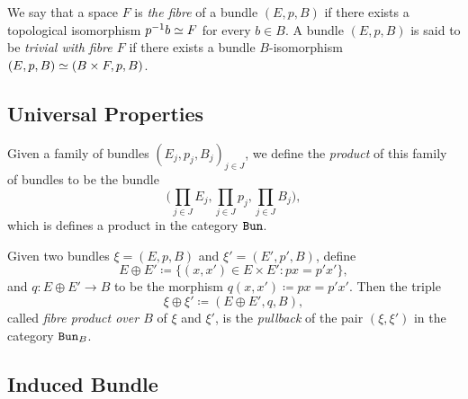 \documentclass[../../../deep-dive]{subfile}
\begin{document}
\begin{definition}
    \label{def:fibre-of-a-bundle}
    We say that a space \(F\) is \emph{the fibre} of a bundle \((E, p, B)\) if there
    exists a topological isomorphism \(p^{-1} b \simeq F\) for every \(b \in B\). A
    bundle \((E, p, B)\) is said to be \emph{trivial with fibre \(F\)} if there
    exists a bundle \(B\)-isomorphism \((E, p, B) \simeq (B \times F, p, B)\).
\end{definition}

\subsection{Universal Properties}

\begin{proposition}
    \label{prop:bundle-products}
    Given a family of bundles \((E_j, p_j, B_j)_{j \in J}\), we define the
    \emph{product} of this family of bundles to be the bundle
    \[
        \Big( \prod_{j \in J} E_j, \prod_{j \in J} p_j, \prod_{j \in J} B_j \Big),
    \]
    which is defines a product in the category \({\texttt{Bun}}\).
\end{proposition}

\begin{proposition}
    \label{prop:fibre-product-over-B}
    Given two bundles \(\xi = (E, p, B)\) and \(\xi' = (E', p', B)\), define
    \[
        E \oplus E' \coloneq \{(x, x') \in E \times E' \colon p x = p' x'\},
    \]
    and \(q: E \oplus E' \to B\) to be the morphism
    \(q(x, x') \coloneq p x = p' x'\). Then the triple
    \[
        \xi \oplus \xi' \coloneq (E \oplus E', q, B),
    \]
    called \emph{fibre product over \(B\)} of \(\xi\) and \(\xi'\), is the
    \emph{pullback} of the pair \((\xi, \xi')\) in the category \({\texttt{Bun}}_B\).
\end{proposition}

\subsection{Induced Bundle}
\end{document}
